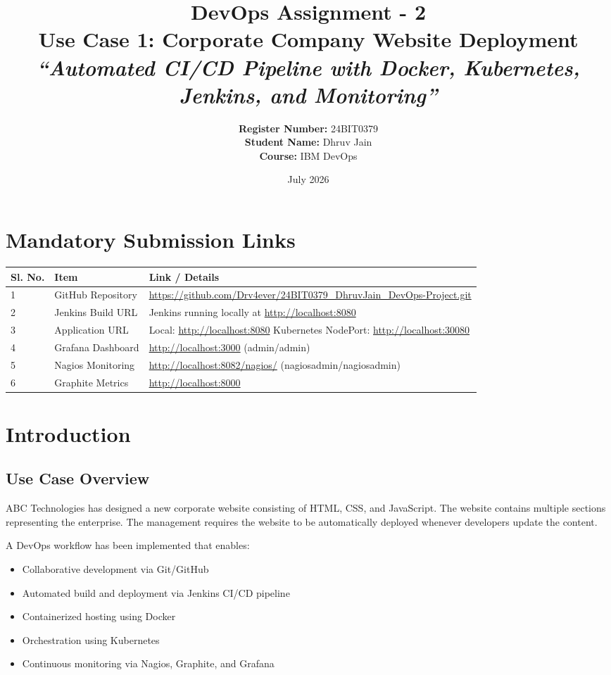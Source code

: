 \documentclass[12pt, a4paper]{article}
\title{\textbf{DevOps Assignment - 2} \\ \vspace{0.5cm} \large Use Case 1: Corporate Company Website Deployment \\ \vspace{0.2cm} \textit{``Automated CI/CD Pipeline with Docker, Kubernetes, Jenkins, and Monitoring''}}
\author{
    \textbf{Register Number:} 24BIT0379 \\
    \textbf{Student Name:} Dhruv Jain \\
    \textbf{Course:} IBM DevOps
}
\date{July 2026}
\begin{document}
\maketitle
\thispagestyle{empty}
\newpage

\tableofcontents
\newpage

\section{Mandatory Submission Links}

\begin{table}[h]
\centering
\renewcommand{\arraystretch}{1.5}
\begin{tabular}{|p{1cm}|p{3.5cm}|p{10cm}|}
\hline
\textbf{Sl. No.} & \textbf{Item} & \textbf{Link / Details} \\ \hline
1 & GitHub Repository & \url{https://github.com/Drv4ever/24BIT0379_DhruvJain_DevOps-Project.git} \\ \hline
2 & Jenkins Build URL & Jenkins running locally at \url{http://localhost:8080} \\ \hline
3 & Application URL & Local: \url{http://localhost:8080} \newline Kubernetes NodePort: \url{http://localhost:30080} \\ \hline
4 & Grafana Dashboard & \url{http://localhost:3000} (admin/admin) \\ \hline
5 & Nagios Monitoring & \url{http://localhost:8082/nagios/} (nagiosadmin/nagiosadmin) \\ \hline
6 & Graphite Metrics & \url{http://localhost:8000} \\ \hline
\end{tabular}
\end{table}

\newpage

\section{Introduction}
\subsection{Use Case Overview}
ABC Technologies has designed a new corporate website consisting of HTML, CSS, and JavaScript. The website contains multiple sections representing the enterprise. The management requires the website to be automatically deployed whenever developers update the content.

A DevOps workflow has been implemented that enables:
\begin{itemize}
    \item Collaborative development via Git/GitHub
    \item Automated build and deployment via Jenkins CI/CD pipeline
    \item Containerized hosting using Docker
    \item Orchestration using Kubernetes
    \item Continuous monitoring via Nagios, Graphite, and Grafana
\end{itemize}
\end{document}
